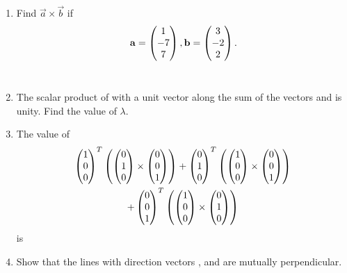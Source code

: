 \documentclass[journal,12pt,twocolumn]{IEEEtran}
\renewcommand\thesection{\arabic{section}}
\begin{document}
\begin{enumerate}[label=\thesection.\arabic*.,ref=\thesection.\theenumi]
\item Find ${\vec{a} \times \vec{b}}$ if 
\begin{align}
\mathbf{a}=\begin{pmatrix}1\\-7\\7\end{pmatrix},
\mathbf{b}=\begin{pmatrix}3\\-2\\2\end{pmatrix}.
\end{align}
\\
\solution 
\item The scalar product of  with a unit vector along the sum  of the vectors  and  is unity.  Find the value of $\lambda$.
\item The value of 
\begin{multline}
\begin{pmatrix}1\\0\\0\end{pmatrix}^T\left(\begin{pmatrix}0\\1\\0\end{pmatrix}\times \begin{pmatrix}0\\0\\1\end{pmatrix}\right)
+\begin{pmatrix}0\\1\\0\end{pmatrix}^T\left(\begin{pmatrix}1\\0\\0\end{pmatrix}\times \begin{pmatrix}0\\0\\1\end{pmatrix}\right)
\\
+\begin{pmatrix}0\\0\\1\end{pmatrix}^T\left(\begin{pmatrix}1\\0\\0\end{pmatrix}\times \begin{pmatrix}0\\1\\0\end{pmatrix}\right)
\end{multline}
%
is 
\begin{enumerate}[itemsep = 2pt]
\end{enumerate}
\solution 
\item Show that the lines with direction vectors ,  and  are mutually perpendicular.

\end{enumerate}
\end{document}
